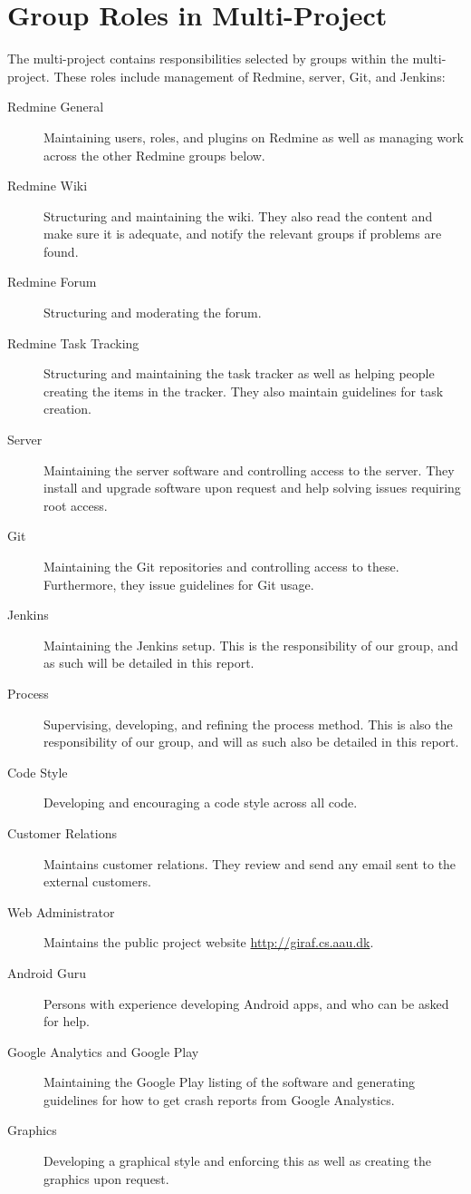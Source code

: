 
\section{Group Roles in Multi-Project}\label{sec:multi_project_group_roles}
The multi-project contains responsibilities selected by groups within the multi-project. These roles include management of Redmine, server, Git, and Jenkins:

\begin{description}
  \item[Redmine General] Maintaining users, roles, and plugins on Redmine as well as managing work across the other Redmine groups below.
  \item[Redmine Wiki] Structuring and maintaining the wiki. They also read the content and make sure it is adequate, and notify the relevant groups if problems are found.
  \item[Redmine Forum] Structuring and moderating the forum.
  \item[Redmine Task Tracking] Structuring and maintaining the task tracker as well as helping people creating the items in the tracker. They also maintain guidelines for task creation.
  \item[Server] Maintaining the server software and controlling access to the server. They install and upgrade software upon request and help solving issues requiring root access.
  \item[Git] Maintaining the Git repositories and controlling access to these. Furthermore, they issue guidelines for Git usage.
  \item[Jenkins] Maintaining the Jenkins setup. This is the responsibility of our group, and as such will be detailed in this report.
  \item[Process] Supervising, developing, and refining the process method. This is also the responsibility of our group, and will as such also be detailed in this report.
  \item[Code Style] Developing and encouraging a code style across all code.
  \item[Customer Relations] Maintains customer relations. They review and send any email sent to the external customers.
  \item[Web Administrator] Maintains the public project website \url{http://giraf.cs.aau.dk}.
  \item[Android Guru] Persons with experience developing Android apps, and who can be asked for help.
  \item[Google Analytics and Google Play] Maintaining the Google Play listing of the software and generating guidelines for how to get crash reports from Google Analystics.
  \item[Graphics] Developing a graphical style and enforcing this as well as creating the graphics upon request.
\end{description}